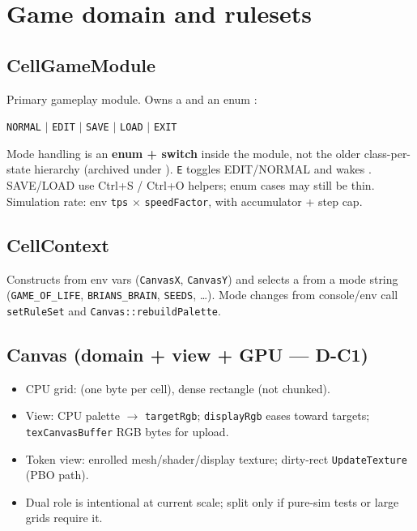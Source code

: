 \section{Game domain and rulesets}
\label{sec:game}

\subsection{CellGameModule}
Primary gameplay module. Owns a  and an enum
:
\begin{center}
\texttt{NORMAL} $\mid$ \texttt{EDIT} $\mid$ \texttt{SAVE} $\mid$ \texttt{LOAD} $\mid$ \texttt{EXIT}
\end{center}

\begin{statusbox}
Mode handling is an \textbf{enum + switch} inside the module, not the older
class-per-state hierarchy (archived under ).
\texttt{E} toggles EDIT/NORMAL and wakes .
SAVE/LOAD use Ctrl+S / Ctrl+O helpers; enum cases may still be thin.
Simulation rate: env \texttt{tps} $\times$ \texttt{speedFactor}, with
accumulator + step cap.
\end{statusbox}

\subsection{CellContext}
Constructs  from env vars (\texttt{CanvasX}, \texttt{CanvasY})
and selects a  from a mode string
(\texttt{GAME\_OF\_LIFE}, \texttt{BRIANS\_BRAIN}, \texttt{SEEDS}, \ldots).
Mode changes from console/env call \texttt{setRuleSet} and
\texttt{Canvas::rebuildPalette}.

\subsection{Canvas (domain + view + GPU --- D-C1)}
\begin{itemize}
  \item CPU grid:  (one byte per cell), dense rectangle
        (not chunked).
  \item View: CPU palette $\rightarrow$ \texttt{targetRgb}; \texttt{displayRgb}
        eases toward targets; \texttt{texCanvasBuffer} RGB bytes for upload.
  \item Token view: enrolled mesh/shader/display texture; dirty-rect
        \texttt{UpdateTexture} (PBO path).
  \item Dual role is intentional at current scale; split only if pure-sim tests
        or large grids require it.
\end{itemize}

